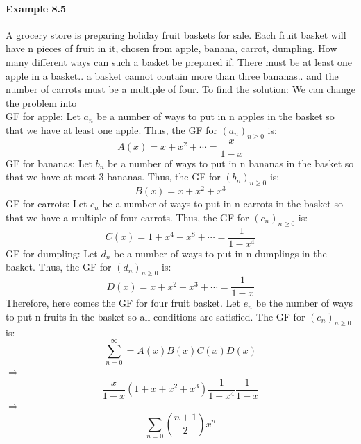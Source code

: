 \documentclass{article}
\begin{document}
\paragraph{Example 8.5}A grocery store is preparing holiday fruit baskets for sale.
Each fruit basket will have n pieces of fruit in it, chosen from apple, banana, carrot, dumpling.\newline
How many different ways can such a basket be prepared if. There must be at least one apple in a basket.. a basket cannot contain more than three bananas.. and the number of carrots must be a multiple of four.\newline
To find the solution:\newline
We can change the problem into 
$$$$
GF for apple:\newline
Let $a_n$ be a number of ways to put in n apples in the basket so
that we have at least one apple.\newline
Thus, the GF for $(a_n)_{n\ge 0}$ is:
$$A(x)=x+x^2+\cdots =\frac{x}{1-x}$$
GF for bananas:\newline
Let $b_n$ be a number of ways to put in n bananas in the basket so
that we have at most 3 bananas.\newline
Thus, the GF for $(b_n)_{n\ge 0}$ is:
$$B(x)=x+x^2+x^3$$
GF for carrots:\newline
Let $c_n$ be a number of ways to put in n carrots in the basket so
that we have a multiple of four carrots.\newline
Thus, the GF for $(c_n)_{n\ge 0}$ is:
$$C(x)=1+x^4+x^8+\cdots =\frac{1}{1-x^4}$$
GF for dumpling:\newline
Let $d_n$ be a number of ways to put in n dumplings in the basket.\newline
Thus, the GF for $(d_n)_{n\ge 0}$ is:
$$D(x)=x+x^2+x^3+\cdots =\frac{1}{1-x}$$
Therefore, here comes the GF for four fruit basket.\newline
Let $e_n$ be the number of ways to put n fruits in the basket so all
conditions are satisfied.
The GF for $(e_n)_{n\ge 0}$ is:
$$\sum_{n=0}^{\infty}=A(x)B(x)C(x)D(x)$$
$\Longrightarrow$
$$\frac{x}{1-x}(1+x+x^2+x^3)\frac{1}{1-x^4}\frac{1}{1-x}$$
$\Longrightarrow$
$$\sum_{n=0}\binom{n+1}{2}x^n$$
\end{document}
